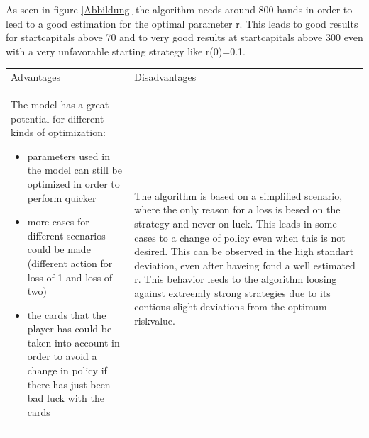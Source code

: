 \documentclass[11pt]{article}
\begin{document}
As seen in figure \ref{Abbildung} the algorithm needs around 800 hands in order to leed to a good estimation for the optimal parameter r. This leads to good results for startcapitals above 70 and to very good results at startcapitals above 300 even with a very unfavorable starting strategy like r(0)=0.1.
\\
\begin{tabular}{ p{7.2cm}  p{7.2cm}}
Advantages & Disadvantages\\
The model has a great potential for different kinds of optimization:
\begin{itemize}
\item parameters used in the model can still be optimized in order to perform quicker
\item more cases for different scenarios could be made (different action for loss of 1 and loss of two)
\item the cards that the player has could be taken into account in order to avoid a change in policy if there has just been bad luck with the cards 
\end{itemize}
 & The algorithm is based on a simplified scenario, where the only reason for a loss is besed on the strategy and never on luck. This leads in some cases to a change of policy even when this is not desired. This can be observed in the high standart deviation, even after haveing fond a well estimated r. This behavior leeds to the algorithm loosing against extreemly strong strategies due to its contious slight deviations from the optimum  riskvalue.\\ 
\end{tabular}
\end{document}
